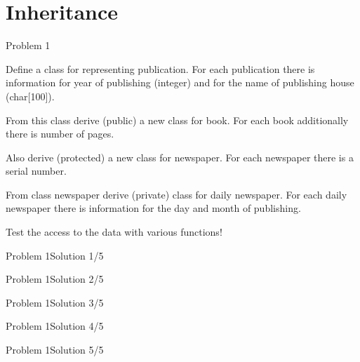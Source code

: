 \section{Inheritance}

\begin{frame}{Problem 1}
\begin{scriptsize}
Define a class for representing publication. For each publication there is
information for year of publishing (integer) and for the name of publishing
house (char[100]).

From this class derive (public) a new class for book. For each book additionally
there is number of pages.

Also derive (protected) a new class for newspaper. For each newspaper there is a
serial number.

From class newspaper derive (private) class for daily newspaper. For each daily
newspaper there is information for the day and month of publishing.

Test the access to the data with various functions!

\end{scriptsize}

\end{frame}

\begin{frame}[fragile]{Problem 1}{Solution 1/5}

\end{frame}

\begin{frame}[fragile]{Problem 1}{Solution 2/5}

\end{frame}

\begin{frame}[fragile]{Problem 1}{Solution 3/5}

\end{frame}

\begin{frame}[fragile]{Problem 1}{Solution 4/5}

\end{frame}

\begin{frame}[fragile]{Problem 1}{Solution 5/5}

\end{frame}

